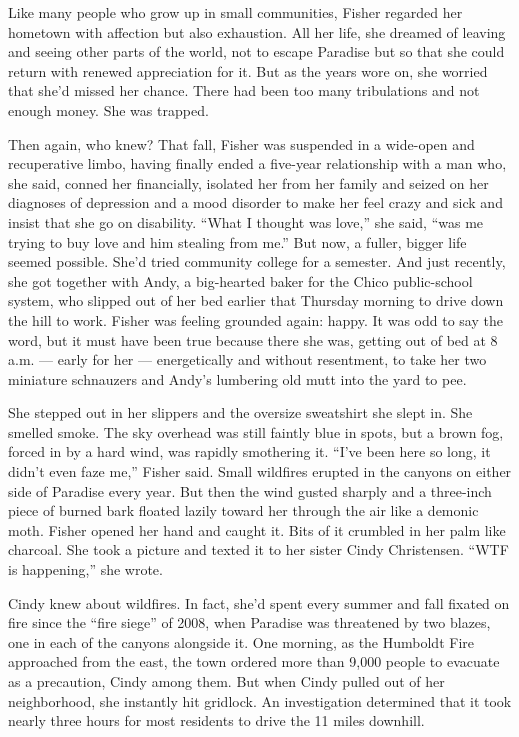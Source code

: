 Like many people who grow up in small communities, Fisher regarded her
hometown with affection but also exhaustion. All her life, she dreamed
of leaving and seeing other parts of the world, not to escape Paradise
but so that she could return with renewed appreciation for it. But as
the years wore on, she worried that she'd missed her chance. There had
been too many tribulations and not enough money. She was trapped.

Then again, who knew? That fall, Fisher was suspended in a wide-open and
recuperative limbo, having finally ended a five-year relationship with a
man who, she said, conned her financially, isolated her from her family
and seized on her diagnoses of depression and a mood disorder to make
her feel crazy and sick and insist that she go on disability. ``What I
thought was love,'' she said, ``was me trying to buy love and him
stealing from me.'' But now, a fuller, bigger life seemed possible.
She'd tried community college for a semester. And just recently, she got
together with Andy, a big-hearted baker for the Chico public-school
system, who slipped out of her bed earlier that Thursday morning to
drive down the hill to work. Fisher was feeling grounded again: happy.
It was odd to say the word, but it must have been true because there she
was, getting out of bed at 8 a.m. --- early for her --- energetically
and without resentment, to take her two miniature schnauzers and Andy's
lumbering old mutt into the yard to pee.

She stepped out in her slippers and the oversize sweatshirt she slept
in. She smelled smoke. The sky overhead was still faintly blue in spots,
but a brown fog, forced in by a hard wind, was rapidly smothering it.
``I've been here so long, it didn't even faze me,'' Fisher said. Small
wildfires erupted in the canyons on either side of Paradise every year.
But then the wind gusted sharply and a three-inch piece of burned bark
floated lazily toward her through the air like a demonic moth. Fisher
opened her hand and caught it. Bits of it crumbled in her palm like
charcoal. She took a picture and texted it to her sister Cindy
Christensen. ``WTF is happening,'' she wrote.

Cindy knew about wildfires. In fact, she'd spent every summer and fall
fixated on fire since the ``fire siege'' of 2008, when Paradise was
threatened by two blazes, one in each of the canyons alongside it. One
morning, as the Humboldt Fire approached from the east, the town ordered
more than 9,000 people to evacuate as a precaution, Cindy among them.
But when Cindy pulled out of her neighborhood, she instantly hit
gridlock. An investigation determined that it took nearly three hours
for most residents to drive the 11 miles downhill.

